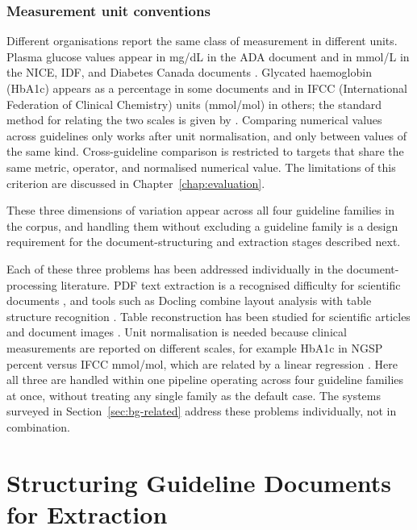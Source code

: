 \subsubsection{Measurement unit conventions}
Different organisations report the same class of measurement in different units. Plasma glucose values appear in mg/dL in the ADA document \cite{ADA2026} and in mmol/L in the NICE, IDF, and Diabetes Canada documents \cite{NICE_T2_2026,IDF2025,CanadaDiabetes_Ch3}. Glycated haemoglobin (HbA1c) appears as a percentage in some documents and in IFCC (International Federation of Clinical Chemistry) units (mmol/mol) in others; the standard method for relating the two scales is given by \cite{hoelzel2004}. Comparing numerical values across guidelines only works after unit normalisation, and only between values of the same kind. Cross-guideline comparison is restricted to targets that share the same
metric, operator, and normalised numerical value. The limitations of this
criterion are discussed in Chapter~\ref{chap:evaluation}.

These three dimensions of variation appear across all four guideline families in the corpus, and handling them without excluding a guideline family is a design requirement for the document-structuring and extraction stages described next.

Each of these three problems has been addressed individually in the
document-processing literature. PDF text extraction is a recognised difficulty
for scientific documents \cite{bast2017,ramakrishnan2012}, and tools such as
Docling combine layout analysis with table structure recognition
\cite{auer2024}. Table reconstruction has been studied for scientific articles
and document images \cite{zhong2020,schreiber2017}. Unit normalisation is
needed because clinical measurements are reported on different scales, for
example HbA1c in NGSP percent versus IFCC mmol/mol, which are related by a
linear regression \cite{hoelzel2004}. Here all three are handled within one
pipeline operating across four guideline families at once, without treating any
single family as the default case. The systems surveyed in
Section~\ref{sec:bg-related} address these problems individually, not in
combination.

\section{Structuring Guideline Documents for Extraction}
\label{sec:ingestion}

